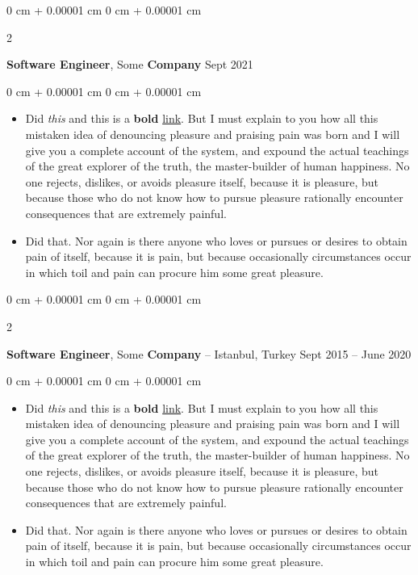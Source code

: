 \documentclass[10pt, letterpaper]{article}
\newenvironment{highlights}{
    \begin{itemize}[
        topsep=0.10 cm,
        parsep=0.10 cm,
        partopsep=0pt,
        itemsep=0pt,
        leftmargin=0 cm + 10pt
    ]
}{
    \end{itemize}
} %
\newenvironment{onecolentry}{
    \begin{adjustwidth}{
        0 cm + 0.00001 cm
    }{
        0 cm + 0.00001 cm
    }
}{
    \end{adjustwidth}
} %
\newenvironment{twocolentry}[2][]{
    \onecolentry
    \def\secondColumn{#2}
    \setcolumnwidth{\fill, 4.5 cm}
    \begin{paracol}{2}
}{
    \switchcolumn \raggedleft \secondColumn
    \end{paracol}
    \endonecolentry
} %
\begin{document}
        \vspace{0.2 cm}

        \begin{twocolentry}{
            Sept 2021
        }
            \textbf{Software Engineer}, Some \textbf{Company}\end{twocolentry}

        \vspace{0.10 cm}
        \begin{onecolentry}
            \begin{highlights}
                \item Did \textit{this} and this is a \textbf{bold} \href{https://example.com}{link}. But I must explain to you how all this mistaken idea of denouncing pleasure and praising pain was born and I will give you a complete account of the system, and expound the actual teachings of the great explorer of the truth, the master-builder of human happiness. No one rejects, dislikes, or avoids pleasure itself, because it is pleasure, but because those who do not know how to pursue pleasure rationally encounter consequences that are extremely painful.
                \item Did that. Nor again is there anyone who loves or pursues or desires to obtain pain of itself, because it is pain, but because occasionally circumstances occur in which toil and pain can procure him some great pleasure.
            \end{highlights}
        \end{onecolentry}


        \vspace{0.2 cm}

        \begin{twocolentry}{
            Sept 2015 – June 2020
        }
            \textbf{Software Engineer}, Some \textbf{Company} -- Istanbul, Turkey\end{twocolentry}

        \vspace{0.10 cm}
        \begin{onecolentry}
            \begin{highlights}
                \item Did \textit{this} and this is a \textbf{bold} \href{https://example.com}{link}. But I must explain to you how all this mistaken idea of denouncing pleasure and praising pain was born and I will give you a complete account of the system, and expound the actual teachings of the great explorer of the truth, the master-builder of human happiness. No one rejects, dislikes, or avoids pleasure itself, because it is pleasure, but because those who do not know how to pursue pleasure rationally encounter consequences that are extremely painful.
                \item Did that. Nor again is there anyone who loves or pursues or desires to obtain pain of itself, because it is pain, but because occasionally circumstances occur in which toil and pain can procure him some great pleasure.
            \end{highlights}
        \end{onecolentry}
\end{document}
